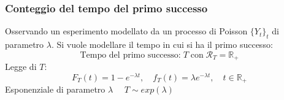 \documentclass[a4paper]{article}
\theoremstyle{break}
\theoremstyle{break}
\theoremstyle{break}
\theoremstyle{break}
\begin{document}
\subsubsection{Conteggio del tempo del primo successo}
Osservando un esperimento modellato da un processo di Poisson \( \{Y_t\}_t  \) di 
parametro \( \lambda \). Si vuole modellare il tempo in cui si ha il primo successo:
\[
  \text{Tempo del primo successo:}\; T \;\text{con}\; \mathcal{R}_T = \mathbb{R}_+
\] 
Legge di \( T \):
\[
  F_T(t)= 1-e^{-\lambda t}, \quad f_T(t) = \lambda e^{-\lambda t}, \quad t \in \mathbb{R}_+
\] 
Esponenziale di parametro \( \lambda \quad \) \( T \sim exp(\lambda) \) 
\end{document}
